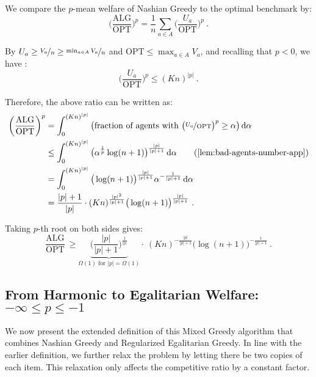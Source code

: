\documentclass[11pt,letterpaper]{article}
\newcommand{\OPT}{\mathrm{OPT}}
\newcommand{\ALG}{\mathrm{ALG}}
\newcommand{\dif}[1]{\,\text{\rm d} #1}
\newcommand{\utility}{U}
\begin{document}
We compare the $p$-mean welfare of Nashian Greedy to the optimal benchmark by:
\[
\bigg( \frac{\ALG}{\OPT} \bigg)^p = \frac{1}{n} \sum_{a\in A} \bigg( \frac{\utility_a}{\OPT} \bigg)^p
~.
\]

By $\utility_a \ge \nicefrac{V_a}{n} \ge \nicefrac{\min_{a\in A} V_a}{n}$ and $\OPT \le \max_{a\in A} V_a$, and recalling that $p < 0$, we have :
\[
\bigg(\frac{\utility_a}{\OPT}\bigg)^p \le (Kn)^{|p|}
~.
\]

Therefore, the above ratio can be written as:
\begin{align*}
	\bigg( \frac{\ALG}{\OPT} \bigg)^p
	& = \int_0^{(Kn)^{|p|}} \big(\text{fraction of agents with $\big( \nicefrac{\utility_a}{\OPT} \big)^p \ge \alpha$}\big) \dif{\alpha} \\
	&
	\le \int_0^{(Kn)^{|p|}} \big( \alpha^{\frac{1}{p}} \log(n+1) \big)^{\frac{|p|}{|p|+1}} \dif{\alpha} 
	\tag{\Cref{lem:bad-agents-number-app}} \\
	&
	= \int_0^{(Kn)^{|p|}} \big( \log(n+1) \big)^{\frac{|p|}{|p|+1}} \alpha^{-\frac{1}{|p|+1}} \dif{\alpha} \\
	&
	= \frac{|p|+1}{|p|} \cdot (Kn)^{\frac{|p|^2}{|p|+1}} \big(\log(n+1) \big)^{\frac{|p|}{|p|+1}}
	~.
\end{align*}

Taking $p$-th root on both sides gives:
\[
\frac{\ALG}{\OPT} ~\ge \underbrace{\bigg( \frac{|p|}{|p|+1} \bigg)^{\frac{1}{|p|}}}_{\text{$\Omega(1)$ for $|p| = \Omega(1)$}} \cdot~ (Kn)^{-\frac{|p|}{|p|+1}} \big(\log(n+1) \big)^{-\frac{1}{|p|+1}}
~.
\]


\subsection[From Harmonic to Egalitarian Welfare]{From Harmonic to Egalitarian Welfare: $-\infty \le p \le -1$}
\label{sec:harmonic-to-egalitarian-app}

We now present the extended definition of this Mixed Greedy algorithm that combines Nashian Greedy and Regularized Egalitarian Greedy.
In line with the earlier definition, we further relax the problem by letting there be two copies of each item.
This relaxation only affects the competitive ratio by a constant factor.
\end{document}
